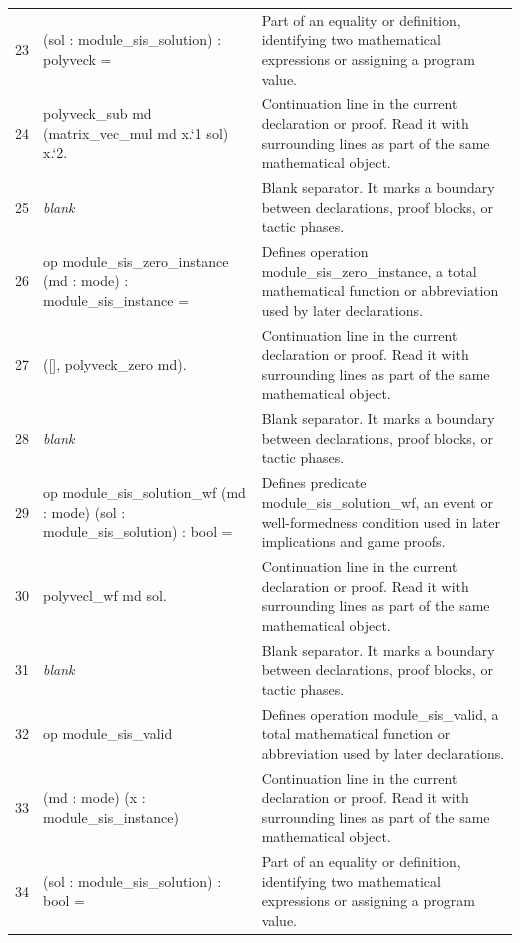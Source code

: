 \documentclass[10pt]{article}
\begin{document}
\begin{longtable}{r L{0.53\textwidth} L{0.37\textwidth}}
23 & {\ttfamily\scriptsize    (sol : module\_sis\_solution) : polyveck =} & Part of an equality or definition, identifying two mathematical expressions or assigning a program value. \\
24 & {\ttfamily\scriptsize   polyveck\_sub md (matrix\_vec\_mul md x.`1 sol) x.`2.} & Continuation line in the current declaration or proof.  Read it with surrounding lines as part of the same mathematical object. \\
25 & {\ttfamily\scriptsize \emph{blank}} & Blank separator.  It marks a boundary between declarations, proof blocks, or tactic phases. \\
26 & {\ttfamily\scriptsize op module\_sis\_zero\_instance (md : mode) : module\_sis\_instance =} & Defines operation module\_sis\_zero\_instance, a total mathematical function or abbreviation used by later declarations. \\
27 & {\ttfamily\scriptsize   ([], polyveck\_zero md).} & Continuation line in the current declaration or proof.  Read it with surrounding lines as part of the same mathematical object. \\
28 & {\ttfamily\scriptsize \emph{blank}} & Blank separator.  It marks a boundary between declarations, proof blocks, or tactic phases. \\
29 & {\ttfamily\scriptsize op module\_sis\_solution\_wf (md : mode) (sol : module\_sis\_solution) : bool =} & Defines predicate module\_sis\_solution\_wf, an event or well-formedness condition used in later implications and game proofs. \\
30 & {\ttfamily\scriptsize   polyvecl\_wf md sol.} & Continuation line in the current declaration or proof.  Read it with surrounding lines as part of the same mathematical object. \\
31 & {\ttfamily\scriptsize \emph{blank}} & Blank separator.  It marks a boundary between declarations, proof blocks, or tactic phases. \\
32 & {\ttfamily\scriptsize op module\_sis\_valid} & Defines operation module\_sis\_valid, a total mathematical function or abbreviation used by later declarations. \\
33 & {\ttfamily\scriptsize    (md : mode) (x : module\_sis\_instance)} & Continuation line in the current declaration or proof.  Read it with surrounding lines as part of the same mathematical object. \\
34 & {\ttfamily\scriptsize    (sol : module\_sis\_solution) : bool =} & Part of an equality or definition, identifying two mathematical expressions or assigning a program value. \\

\end{longtable}
\end{document}
